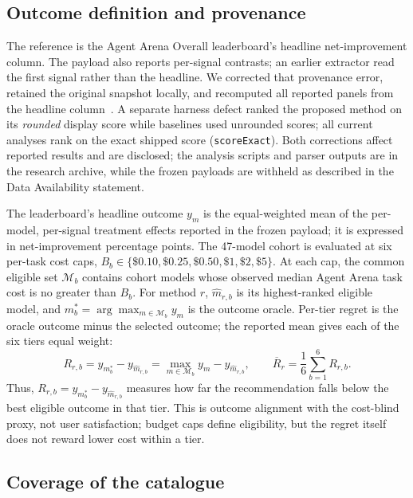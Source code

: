 \documentclass[pdflatex,sn-mathphys-num]{sn-jnl}
\theoremstyle{thmstyleone}
\theoremstyle{thmstylethree}
\begin{document}
\subsection{Outcome definition and provenance}\label{subsec:outcome}

The reference is the Agent Arena Overall leaderboard's headline net-improvement column. The payload also reports per-signal contrasts; an earlier extractor read the first signal rather than the headline. We corrected that provenance error, retained the original snapshot locally, and recomputed all reported panels from the headline column~\cite{arenaagent2026}. A separate harness defect ranked the proposed method on its \emph{rounded} display score while baselines used unrounded scores; all current analyses rank on the exact shipped score (\texttt{scoreExact}). Both corrections affect reported results and are disclosed; the analysis scripts and parser outputs are in the research archive, while the frozen payloads are withheld as described in the Data Availability statement.

The leaderboard's headline outcome $y_m$ is the equal-weighted mean of the per-model, per-signal treatment effects reported in the frozen payload; it is expressed in net-improvement percentage points. The 47-model cohort is evaluated at six per-task cost caps, $B_b\in\{\$0.10,\$0.25,\$0.50,\$1,\$2,\$5\}$. At each cap, the common eligible set $\mathcal{M}_b$ contains cohort models whose observed median Agent Arena task cost is no greater than $B_b$. For method $r$, $\hat m_{r,b}$ is its highest-ranked eligible model, and $m_b^*=\arg\max_{m\in\mathcal{M}_b}y_m$ is the outcome oracle. Per-tier regret is the oracle outcome minus the selected outcome; the reported mean gives each of the six tiers equal weight:
\begin{equation}\label{eq:regret}
R_{r,b}=y_{m_b^*}-y_{\hat m_{r,b}}=\max_{m\in\mathcal{M}_b}y_m-y_{\hat m_{r,b}},\qquad \overline{R}_r=\frac{1}{6}\sum_{b=1}^{6}R_{r,b}.
\end{equation}
Thus, $R_{r,b}=y_{m_b^*}-y_{\hat m_{r,b}}$ measures how far the recommendation falls below the best eligible outcome in that tier. This is outcome alignment with the cost-blind proxy, not user satisfaction; budget caps define eligibility, but the regret itself does not reward lower cost within a tier.

\subsection{Coverage of the catalogue}\label{subsec:coverage}
\end{document}
